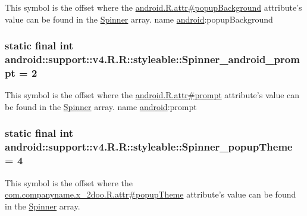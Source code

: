 This symbol is the offset where the \hyperlink{}{android.R.attr\#popupBackground} attribute's value can be found in the \hyperlink{classandroid_1_1support_1_1v4_1_1_r_1_1styleable_7b6b9d4f9b35dbabe5f917505d63c414}{Spinner} array.  name \hyperlink{namespaceandroid}{android}:popupBackground \hypertarget{classandroid_1_1support_1_1v4_1_1_r_1_1styleable_66514c7282401aadd8fcf1b7cf06da7a}{
\subsubsection[{Spinner\_\-android\_\-prompt}]{\setlength{\rightskip}{0pt plus 5cm}static final int android::support::v4.R.R::styleable::Spinner\_\-android\_\-prompt = 2}}
\label{classandroid_1_1support_1_1v4_1_1_r_1_1styleable_66514c7282401aadd8fcf1b7cf06da7a}


This symbol is the offset where the \hyperlink{}{android.R.attr\#prompt} attribute's value can be found in the \hyperlink{classandroid_1_1support_1_1v4_1_1_r_1_1styleable_7b6b9d4f9b35dbabe5f917505d63c414}{Spinner} array.  name \hyperlink{namespaceandroid}{android}:prompt \hypertarget{classandroid_1_1support_1_1v4_1_1_r_1_1styleable_b914ffabdea8381281dd34343fb1a5f1}{
\subsubsection[{Spinner\_\-popupTheme}]{\setlength{\rightskip}{0pt plus 5cm}static final int android::support::v4.R.R::styleable::Spinner\_\-popupTheme = 4}}
\label{classandroid_1_1support_1_1v4_1_1_r_1_1styleable_b914ffabdea8381281dd34343fb1a5f1}


This symbol is the offset where the \hyperlink{classcom_1_1companyname_1_1x__2doo_1_1_r_1_1attr_d403115dfb9e747c8d3dcd84eb00fe4b}{com.companyname.x\_\-2doo.R.attr\#popupTheme} attribute's value can be found in the \hyperlink{classandroid_1_1support_1_1v4_1_1_r_1_1styleable_7b6b9d4f9b35dbabe5f917505d63c414}{Spinner} array.

